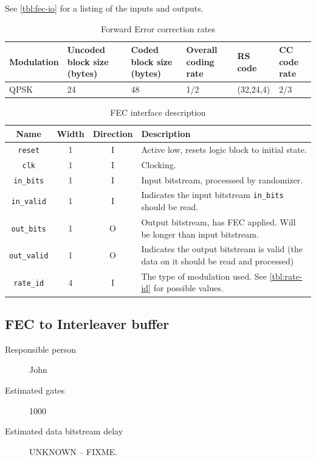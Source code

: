 \documentclass[dvips,10pt,twocolumn]{article}
\newcommand{\wire}{\texttt}
\begin{document}
See \autoref{tbl:fec-io} for a listing of the inputs and outputs.

\begin{table}
	\begin{tabularx}{\linewidth}{X|X|X|X|X|X}
	\label{tbl:fec-param}
		Modulation & Uncoded block size (bytes) &
		Coded block size (bytes) & Overall coding
		rate & RS code & CC code rate \\ \hline
		QPSK & 24 & 48 & 1/2 & (32,24,4) & 2/3 \\
	\end{tabularx}
	\caption{Forward Error correction rates}
\end{table}

\begin{table} \begin{tabularx}{\linewidth}{c|c|c|X}
	\label{tbl:fec-io}
	Name & Width & Direction & Description \\ \hline

	\wire{reset} & 1 & I & Active low, resets logic block to initial
	state. \\

	\wire{clk}   & 1 & I & Clocking. \\

	\wire{in\_bits} & 1 & I & Input bitstream, processsed by randomizer.
	\\

	\wire{in\_valid} & 1 & I & Indicates the input bitstream
	\wire{in\_bits} should be read.\\

	\wire{out\_bits} & 1 & O & Output bitstream, has FEC
	applied. Will be longer than input bitstream. \\

	\wire{out\_valid} & 1 & O & Indicates the output bitstream
	is valid (the data on it should be read and processed) \\

	\wire{rate\_id} & 4 & I & The type of modulation used. See
	\autoref{tbl:rate-id} for possible values.

\end{tabularx} \caption{FEC interface description} \end{table}


\subsection{FEC to Interleaver buffer}
\label{sec:fec_buffer}
\begin{description}
	\item[Responsible person] John 
	\item[Estimated gates] 1000
	\item[Estimated data bitstream delay] UNKNOWN -- FIXME.
\end{description}
\end{document}
